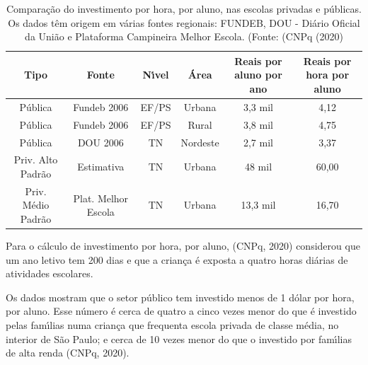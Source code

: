 \documentclass[
12pt,		%
openright,	%
twoside,  %
a4paper,			%
chapter=TITLE,		%
english,			%
french,				%
spanish,			%
brazil				%
]{USPSC-classe/USPSC}
\begin{document}
\begin{table}[htb]
\tiny
\caption{\label{489af209007e651b007535a7733d5ca117c5b310}Compara\c{c}\~ao do investimento por hora, por aluno, nas escolas privadas e p\'ublicas. Os dados t\^em origem em v\'arias fontes regionais: FUNDEB, DOU - Di\'ario Oficial da Uni\~ao e Plataforma Campineira Melhor Escola. (Fonte: (CNPq (2020)}

\centering
\begin{tabular}{|c|c|c|c|c|c|}
\hline
Tipo  &  Fonte  &  N\'{\i}vel  &  \'Area  &  Reais por aluno por ano  &  Reais por hora por aluno \\
\hline
P\'ublica  &  Fundeb 2006  &  EF/PS  &  Urbana  &  3,3 mil  &  4,12 \\
P\'ublica  &  Fundeb 2006  &  EF/PS  &  Rural  &  3,8 mil  &  4,75 \\
P\'ublica  &  DOU 2006  &  TN  &  Nordeste  &  2,7 mil  &  3,37 \\
Priv. Alto Padr\~ao  &  Estimativa  &  TN  &  Urbana  &  48 mil  &  60,00 \\
Priv. M\'edio Padr\~ao  &  Plat. Melhor Escola  &  TN  &  Urbana  &  13,3 mil  &  16,70 \\
\hline
\end{tabular}
\end{table}


Para o c\'alculo de investimento por hora, por aluno, (CNPq, 2020) considerou que um ano letivo tem 200 dias e que a crian\c{c}a \'e exposta a quatro horas di\'arias de atividades escolares.









Os dados mostram que o setor p\'ublico tem investido menos de 1 d\'olar por hora, por aluno. Esse n\'umero \'e cerca de quatro a cinco vezes menor do que \'e investido pelas fam\'{\i}lias numa crian\c{c}a que frequenta escola privada de classe m\'edia, no interior de S\~ao Paulo; e cerca de 10 vezes menor do que o investido por fam\'{\i}lias de alta renda (CNPq, 2020).










\noindent\begin{center}\mbox{\centering{}}\end{center}
\end{document}
